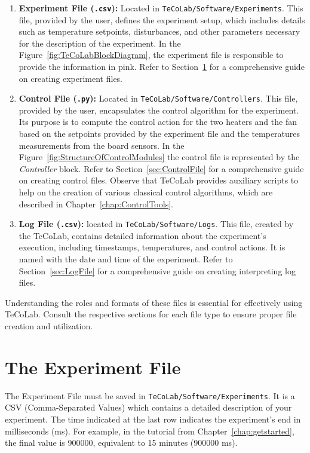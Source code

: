 \documentclass[12pt]{report}
\begin{document}
\begin{enumerate}
\item \textbf{Experiment File (\texttt{.csv}):} Located in \texttt{TeCoLab/Software/Experiments}. This file, provided by the user, defines the experiment setup, which includes details such as temperature setpoints, disturbances, and other parameters necessary for the description of the experiment. In the Figure~\ref{fig:TeCoLabBlockDiagram}, the experiment file is responsible to provide the information in pink. Refer to Section~\ref{sec:ExpFile} for a comprehensive guide on creating experiment files.


\item \textbf{Control File (\texttt{.py}):} Located in \texttt{TeCoLab/Software/Controllers}. This file, provided by the user, encapsulates the control algorithm for the experiment. Its purpose is to compute the control action for the two heaters and the fan based on the setpoints provided by the experiment file and the temperatures measurements from the board sensors. In the Figure~\ref{fig:StructureOfControlModules} the control file is represented by the \emph{Controller} block. Refer to Section~\ref{sec:ControlFile} for a comprehensive guide on creating control files. Observe that TeCoLab provides auxiliary scripts to help on the creation of various classical control algorithms, which are described in Chapter~\ref{chap:ControlTools}.

\item \textbf{Log File (\texttt{.csv}):} located in \texttt{TeCoLab/Software/Logs}. This file, created by the TeCoLab, contains detailed information about the experiment's execution, including timestamps, temperatures, and control actions. It is named with the date and time of the experiment. Refer to Section~\ref{sec:LogFile} for a comprehensive guide on creating interpreting log files.

\end{enumerate}

Understanding the roles and formats of these files is essential for effectively using TeCoLab. Consult the respective sections for each file type to ensure proper file creation and utilization.

\section{The Experiment File}\label{sec:ExpFile}

The Experiment File must be saved in \texttt{TeCoLab/Software/Experiments}. It is a CSV (Comma-Separated Values) which contains a detailed description of your experiment. The time indicated at the last row indicates the experiment's end in milliseconds (ms). For example, in the tutorial from Chapter~\ref{chap:getstarted}, the final value is 900000, equivalent to 15 minutes (900000 ms).
\end{document}
